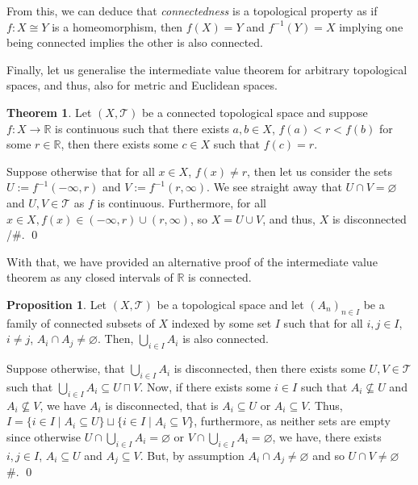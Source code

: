 \documentclass[
]{article}
\theoremstyle{definition}
\newtheorem{theorem}{Theorem}
\newtheorem{prop}{Proposition}
\theoremstyle{definition}
\begin{document}
From this, we can deduce that \emph{connectedness} is a topological
property as if \(f : X \cong Y\) is a homeomorphism, then \(f(X) = Y\)
and \(f^{-1}(Y) = X\) implying one being connected implies the other is
also connected.

Finally, let us generalise the intermediate value theorem for arbitrary
topological spaces, and thus, also for metric and Euclidean spaces.

\begin{theorem}
  Let \((X, \mathcal{T})\) be a connected topological space and suppose 
  \(f : X \to \mathbb{R}\) is continuous such that there exists \(a, b \in X\), 
  \(f(a) < r < f(b)\) for some \(r \in \mathbb{R}\), then there exists some 
  \(c \in X\) such that \(f(c) = r\).
\end{theorem}
\proof

Suppose otherwise that for all \(x \in X\), \(f(x) \neq r\), then let us
consider the sets \(U := f^{-1}(-\infty, r)\) and
\(V := f^{-1}(r, \infty)\). We see straight away that
\(U \cap V = \varnothing\) and \(U, V \in \mathcal{T}\) as \(f\) is
continuous. Furthermore, for all
\(x \in X, f(x) \in  (-\infty, r) \cup (r, \infty)\), so
\(X = U \cup V\), and thus, \(X\) is disconnected /\#. \qed

With that, we have provided an alternative proof of the intermediate
value theorem as any closed intervals of \(\mathbb{R}\) is connected.

\begin{prop}
  Let \((X, \mathcal{T})\) be a topological space and let \((A_n)_{n \in I}\) 
  be a family of connected subsets of \(X\) indexed by some set \(I\) such 
  that for all \(i, j \in I\), \(i \neq j\), \(A_i \cap A_j \neq \varnothing\).
  Then, \(\bigcup_{i \in I} A_i\) is also connected.
\end{prop}
\proof

Suppose otherwise, that \(\bigcup_{i \in I} A_i\) is disconnected, then
there exists some \(U, V \in \mathcal{T}\) such that
\(\bigcup_{i \in I} A_i \subseteq U \sqcap V\). Now, if there exists
some \(i \in I\) such that \(A_i \not\subseteq U\) and
\(A_i \not\subseteq V\), we have \(A_i\) is disconnected, that is
\(A_i \subseteq U\) or \(A_i \subseteq V\). Thus,
\(I = \{i \in I \mid A_i \subseteq U\} \sqcup  \{i \in I \mid A_i \subseteq V\}\),
furthermore, as neither sets are empty since otherwise
\(U \cap \bigcup_{i \in I} A_i = \varnothing\) or
\(V \cap \bigcup_{i \in I} A_i = \varnothing\), we have, there exists
\(i, j \in I\), \(A_i \subseteq U\) and \(A_j \subseteq V\). But, by
assumption \(A_i \cap A_j \neq \varnothing\) and so
\(U \cap V \neq \varnothing\) \#. \qed
\end{document}
